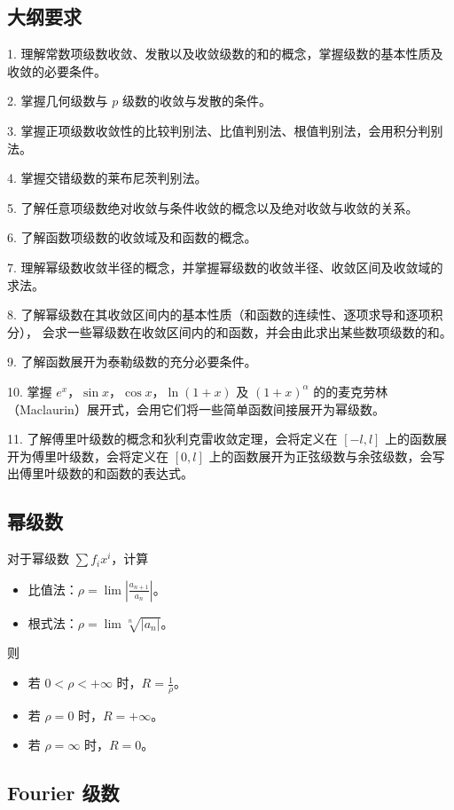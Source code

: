 \subsection{大纲要求}

1. 理解常数项级数收敛、发散以及收敛级数的和的概念，掌握级数的基本性质及收敛的必要条件。

2. 掌握几何级数与 $p$ 级数的收敛与发散的条件。

3. 掌握正项级数收敛性的比较判别法、比值判别法、根值判别法，会用积分判别法。

4. 掌握交错级数的莱布尼茨判别法。

5. 了解任意项级数绝对收敛与条件收敛的概念以及绝对收敛与收敛的关系。

6. 了解函数项级数的收敛域及和函数的概念。

7. 理解幂级数收敛半径的概念，并掌握幂级数的收敛半径、收敛区间及收敛域的求法。

8. 了解幂级数在其收敛区间内的基本性质（和函数的连续性、逐项求导和逐项积分），
会求一些幂级数在收敛区间内的和函数，并会由此求出某些数项级数的和。

9. 了解函数展开为泰勒级数的充分必要条件。

10. 掌握 $e^x$，$\sin x$，$\cos x$，$\ln(1+x)$ 及 $(1+x)^{\alpha}$ 的的麦克劳林（Maclaurin）展开式，会用它们将一些简单函数间接展开为幂级数。

11. 了解傅里叶级数的概念和狄利克雷收敛定理，会将定义在 $[-l, l]$ 上的函数展开为傅里叶级数，会将定义在 $[0, l]$ 上的函数展开为正弦级数与余弦级数，会写出傅里叶级数的和函数的表达式。

\subsection{幂级数}


对于幂级数 $\sum f_i x^i$，计算
\begin{itemize}
	\item 比值法：$\rho = \lim \left| \frac{a_{n+1}}{a_n} \right|$。
	\item 根式法：$\rho = \lim \sqrt[n]{|a_n|}$。
\end{itemize}
则
\begin{itemize}
	\item 若 $0 < \rho < +\infty$ 时，$R = \frac{1}{\rho}$。
	\item 若 $\rho = 0$ 时，$R = +\infty$。
	\item 若 $\rho = \infty$ 时，$R = 0$。
\end{itemize}

\subsection{Fourier 级数}

